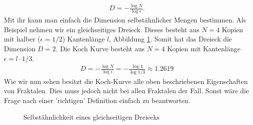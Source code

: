 \begin{align*}
	D = - \frac{\log N}{\log \epsilon }.
\end{align*}
Mit ihr kann man einfach die Dimension selbstähnlicher Mengen bestimmen.
Als Beispiel nehmen wir ein gleichseitiges Dreieck. Dieses besteht aus $N = 4$ Kopien mit halber ($\epsilon = 1/2$) Kantenlänge $l$, Abbildung \ref{ifs:trinagle}.
Somit hat das Dreieck die Dimension $D = 2$.
Die Koch Kurve besteht aus $N = 4$ Kopien mit Kantenlänge $\epsilon =l \cdot 1/3$.
\begin{align*}
	D = - \frac{\log N }{\log \epsilon } = - \frac{\log 4 }{\log 1/3 } \approx 1.2619
\end{align*}
Wie wir nun sehen besitzt die Koch-Kurve alle oben beschriebenen Eigenschaften von Fraktalen. 
Dies muss jedoch nicht bei allen Fraktalen der Fall. Sonst wäre die Frage nach einer 'richtigen' Definition einfach zu beantworten.
\begin{figure}
	\centering
	\caption{Selbstähnlichkeit eines gleichseitigen Dreiecks}
	\label{ifs:trinagle}
\end{figure}

